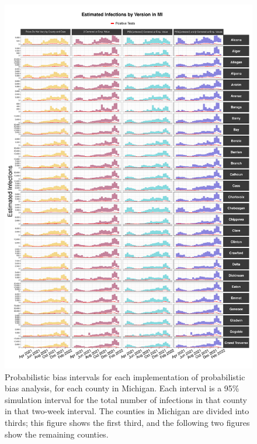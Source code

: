 \documentclass[12pt,twoside]{smiththesis}
\begin{document}
\begin{figure}

{\centering \includegraphics[width=1\linewidth]{figure/mi1_pb_compared_to_observed} 

}

\caption{\label{fig:pb_versions_mi-1} Probabilistic bias intervals for each implementation of probabilistic bias analysis, for each county in Michigan. Each interval is a 95\% simulation interval for the total number of infections in that county in that two-week interval. The counties in Michigan are divided into thirds; this figure shows the first third, and the following two figures show the remaining counties.}\label{fig:unnamed-chunk-118}
\end{figure}
\end{document}
